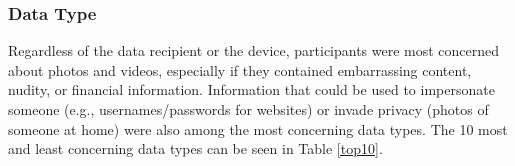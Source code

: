 \documentclass{acm_proc_article-sp}
\begin{document}
%
%

\subsubsection{Data Type}
Regardless of the data recipient or the device, participants were most concerned about photos and videos, especially if they contained embarrassing content, nudity, or financial information. Information that could be used to impersonate someone (e.g., usernames/passwords for websites) or invade privacy (photos of someone at home) were also among the most concerning data types. The 10 most and least concerning data types can be seen in Table \ref{top10}.
\end{document}
